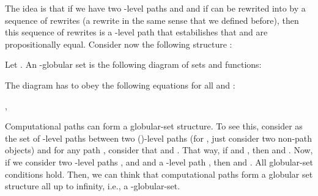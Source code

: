 \documentclass{entcs} \usepackage{entcsmacro}
\begin{document}
The idea is that if we have two -level paths  and  and if   can be rewrited into  by a sequence of rewrites (a rewrite in the same sense that we defined before), then this sequence of rewrites is a -level path that estabilishes that  and  are propositionally equal. Consider now the following structure \cite{Tom}:

\begin{definition}
Let . An -globular set  is the following diagram of sets and functions: 

\bigskip

\begin{center}
\end{center}

\bigskip

The diagram has to obey the following equations for all  and :

\begin{center}
, \quad 
\end{center}

\end{definition}

Computational paths can form a globular-set structure. To see this, consider  as the set of -level paths between two ()-level paths (for , just consider two non-path objects) and for any path , consider that  and . That way, if  and , then  and . Now, if we consider two -level paths , and  and a -level path , then  and . All globular-set conditions hold. Then, we can think that computational paths form a globular set structure all up to infinity, i.e., a -globular-set.
\end{document}
